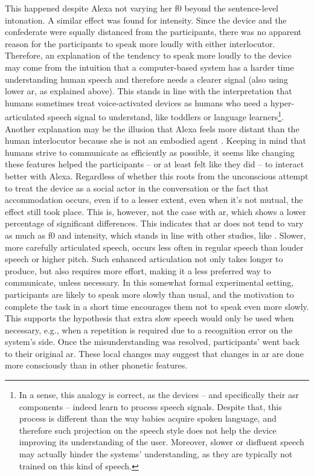 This happened despite Alexa not varying her \ac{f0} beyond the sentence-level intonation.
A similar effect was found for intensity.
Since the device and the confederate were squally distanced from the participants, there was no apparent reason for the participants to speak more loudly with either interlocutor.
Therefore, an explanation of the tendency to speak more loudly to the device may come from the intuition that a computer-based system has a harder time understanding human speech and therefore needs a clearer signal (also using lower \ac{ar}, as explained above).
This stands in line with the interpretation that humans sometimes treat voice-activated devices as humans who need a hyper-articulated speech signal to understand, like toddlers or language learners\footnote{In a sense, this analogy is correct, as the devices -- and specifically their \ac{asr} components -- indeed learn to process speech signals.
Despite that, this process is different than the way babies acquire spoken language, and therefore such projection on the speech style does not help the device improving its understanding of the user.
Moreover, slower or disfluent speech may actually hinder the systems' understanding, as they are typically not trained on this kind of speech.}.
Another explanation may be the illusion that Alexa feels more distant than the human interlocutor because she is not an embodied agent \citep[cf.][and see \cref{sec:types_of_sdss} for further details]{Staum2010virtually, Gijssels2016speech}.
Keeping in mind that humans strive to communicate as efficiently as possible, it seems like changing these features helped the participants -- or at least felt like they did -- to interact better with Alexa.
Regardless of whether this roots from the unconscious attempt to treat the device as a social actor in the conversation \citep{Nass1994computers, Nass2000machines} or the fact that accommodation occurs, even if to a lesser extent, even when it's not mutual, the effect still took place.
This is, however, not the case with \ac{ar}, which shows a lower percentage of significant differences.
This indicates that \ac{ar} does not tend to vary as much as \ac{f0} and intensity, which stands in line with other studies, like \citet{Schweitzer2013convergence}.
Slower, more carefully articulated speech, occurs less often in regular speech than louder speech or higher pitch.
Such enhanced articulation not only takes longer to produce, but also requires more effort, making it a less preferred way to communicate, unless necessary.
In this somewhat formal experimental setting, participants are likely to speak more slowly than usual, and the motivation to complete the task in a short time encourages them not to speak even more slowly.
This supports the hypothesis that extra slow speech would only be used when necessary, e.g., when a repetition is required due to a recognition error on the system's side.
Once the misunderstanding was resolved, participants' went back to their original \ac{ar}.
These local changes may suggest that changes in \ac{ar} are done more consciously than in other phonetic features.

